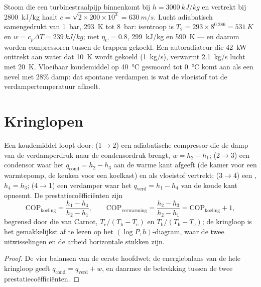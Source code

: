 \begin{example}\label{ex:b2:open-systems:numbers}
Stoom die een turbinestraalpijp binnenkomt bij $h = \qty{3000}{kJ/kg}$ en vertrekt
bij \qty{2800}{kJ/kg} haalt
$c = \sqrt{2 \times 200 \times 10^3} =
\qty{630}{m/s}$. Lucht adiabatisch
samengedrukt van \qty{1}{bar},
\qty{293}{K} tot \qty{8}{bar}: isentroop is
$T_2 = 293 \times 8^{0.286} =
\qty{531}{K}$ en
$w = c_p\Delta T = \qty{239}{kJ/kg}$; met $\eta_{\text{C}} =
0.8$,
\qty{299}{kJ/kg} en \qty{590}{K} --- en daarom worden compressoren
tussen de trappen gekoeld. Een autoradiateur die \qty{42}{kW} onttrekt aan water
dat \qty{10}{K} wordt gekoeld (\qty{1}{kg/s}), verwarmt \qty{2.1}{kg/s} lucht met
\qty{20}{K}. Vloeibaar koudemiddel op \qty{40}{\celsius} gesmoord tot
\qty{0}{\celsius} komt aan als een nevel met $28\%$ damp: dat spontane verdampen
is wat de vloeistof tot de verdampertemperatuur afkoelt.
\end{example}

\section{Kringlopen}

\begin{proposition}\label{prop:b2:open-systems:fridge}
Een koudemiddel loopt door: (1$\to$2) een adiabatische compressor
die de damp van de verdamperdruk naar de condensordruk brengt,
$w = h_2 - h_1$; (2$\to$3) een condensor waar het
$q_{\text{cond}} = h_2 - h_3$ aan de warme kant afgeeft (de kamer voor een
warmtepomp, de
keuken voor een koelkast) en als vloeistof vertrekt; (3$\to$4) een
, $h_4
= h_3$; (4$\to$1) een verdamper waar het
$q_{\text{verd}} = h_1 - h_4$
van de koude kant opneemt. De prestatiecoëfficiënten zijn
\[
\mathrm{COP}_{\text{koeling}} = \frac{h_1 - h_4}{h_2 - h_1}, \qquad
\mathrm{COP}_{\text{verwarming}} = \frac{h_2 - h_3}{h_2 - h_1} = \mathrm{COP}_{\text{koeling}} + 1 ,
\]
begrensd door die van Carnot, $T_{\text{c}}/(T_{\text{h}} - T_{\text{c}})$ en
$T_{\text{h}}/(T_{\text{h}} - T_{\text{c}})$; de kringloop is het
gemakkelijkst af te lezen op
het $(\log P, h)$-diagram, waar de twee uitwisselingen en de arbeid
horizontale stukken zijn.
\end{proposition}

\begin{proof}
De vier balansen van de eerste hoofdwet; de energiebalans van de hele kringloop
geeft $q_{\text{cond}} = q_{\text{verd}} + w$, en daarmee de betrekking tussen
de twee prestatiecoëfficiënten.
\end{proof}

